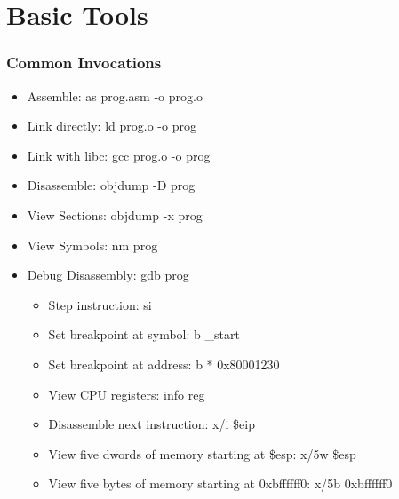 \documentclass[11pt,xcolor=dvipsnames]{beamer}
\begin{document}
\section{Basic Tools}
\begin{frame}[fragile,t]
\frametitle{Common Invocations}
\begin{itemize}
    \item Assemble: {\ttfamily as prog.asm -o prog.o}
    \item Link directly: {\ttfamily ld prog.o -o prog}
    \item Link with libc: {\ttfamily gcc prog.o -o prog}
    \item Disassemble: {\ttfamily objdump -D prog}
    \item View Sections: {\ttfamily objdump -x prog}
    \item View Symbols: {\ttfamily nm prog}
    \item Debug Disassembly: {\ttfamily gdb prog}
    \begin{itemize}
        \item Step instruction: {\ttfamily si}
        \item Set breakpoint at symbol: {\ttfamily b \_start}
        \item Set breakpoint at address: {\ttfamily b * 0x80001230}
        \item View CPU registers: {\ttfamily info reg}
        \item Disassemble next instruction: {\ttfamily x/i \$eip}
        \item View five dwords of memory starting at {\ttfamily \$esp}: {\ttfamily x/5w \$esp}
        \item View five bytes of memory starting at {\ttfamily 0xbffffff0}: {\ttfamily x/5b 0xbffffff0}
    \end{itemize}
\end{itemize}
\end{frame}
\end{document}

